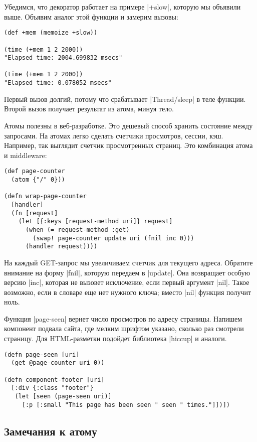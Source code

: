 Убедимся, что декоратор работает на примере \spverb|+slow|, которую мы объявили
выше. Объявим аналог этой функции и замерим вызовы:

\begin{verbatim}
(def +mem (memoize +slow))

(time (+mem 1 2 2000))
"Elapsed time: 2004.699832 msecs"

(time (+mem 1 2 2000))
"Elapsed time: 0.078052 msecs"
\end{verbatim}

Первый вызов долгий, потому что срабатывает \spverb|Thread/sleep| в теле
функции. Второй вызов получает результат из атома, минуя тело.

Атомы полезны в веб-разработке. Это дешевый способ хранить состояние между
запросами. На атомах легко сделать счетчики просмотров, сессии, кэш. Например,
так выглядит счетчик просмотренных страниц. Это комбинация атома и middleware:

\begin{verbatim}
(def page-counter
  (atom {"/" 0}))

(defn wrap-page-counter
  [handler]
  (fn [request]
    (let [{:keys [request-method uri]} request]
      (when (= request-method :get)
        (swap! page-counter update uri (fnil inc 0)))
      (handler request))))
\end{verbatim}

На каждый GET-запрос мы увеличиваем счетчик для текущего адреса. Обратите
внимание на форму \spverb|fnil|, которую передаем в \spverb|update|. Она
возвращает особую версию \spverb|inc|, которая не вызовет исключение, если
первый аргумент \spverb|nil|. Такое возможно, если в словаре еще нет нужного
ключа; вместо \spverb|nil| функция получит ноль.

Функция \spverb|page-seen| вернет число просмотров по адресу страницы. Напишем
компонент подвала сайта, где мелким шрифтом указано, сколько раз смотрели
страницу. Для HTML-разметки подойдет библиотека
\spverb|hiccup| и аналоги.

\begin{verbatim}
(defn page-seen [uri]
  (get @page-counter uri 0))

(defn component-footer [uri]
  [:div {:class "footer"}
   (let [seen (page-seen uri)]
     [:p [:small "This page has been seen " seen " times."]])])
\end{verbatim}

\subsection{Замечания к атому}

